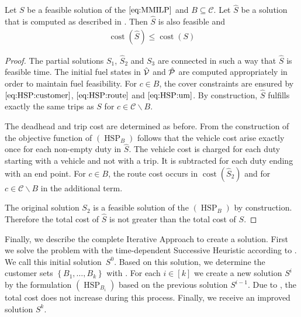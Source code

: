 \begin{lemma}
\label{lem:feasibility_hsp}

Let $S$ be a feasible solution of the $\eqref{eq:MMILP}$ and $B\subseteq\mathcal{C}$. Let $\widehat{S}$ be a solution that is computed as described in . Then $\widehat{S}$ is also feasible and
\begin{align*}
	\operatorname{cost}\left(\widehat{S}\right) \leq \operatorname{cost}\left(S\right)
\end{align*}

\end{lemma}

\begin{proof}

The partial solutions $S_1$, $\widehat{S}_2$ and $S_3$ are connected in such a way that $\widehat{S}$ is feasible \wrt time. The initial fuel states in $\hat{\mathcal{V}}$ and $\hat{\mathcal{P}}$ are computed appropriately in order to maintain fuel feasibility. For ${c\in B}$, the cover constraints are ensured by $\eqref{eq:HSP:customer}$, $\eqref{eq:HSP:route}$ and $\eqref{eq:HSP:um}$. By construction, $\widehat{S}$ fulfills exactly the same trips as $S$ for ${c\in\mathcal{C}\backslash B}$.

The deadhead and trip cost are determined as before. From the construction of the objective function of $(\operatorname{HSP}_B)$ follows that the vehicle cost arise exactly once for each non-empty duty in $\widehat{S}$. The vehicle cost is charged for each duty starting with a vehicle and not with a trip. It is subtracted for each duty ending with an end point. For ${c\in B}$, the route cost occurs in $\operatorname{cost}\left(\widehat{S}_2\right)$ and for ${c\in\mathcal{C}\backslash B}$ in the additional term.

The original solution $S_2$ is a feasible solution of the $(\operatorname{HSP}_B)$ by construction. Therefore the total cost of $\widehat{S}$ is not greater than the total cost of $S$.

\end{proof}

Finally, we describe the complete Iterative Approach to create a solution. First we solve the problem with the time-dependent Successive Heuristic according to . We call this initial solution~$S^0$. Based on this solution, we determine the customer sets $\left\{B_1,\dots,B_k\right\}$ with . For each ${i\in[k]}$ we create a new solution $S^i$ by the formulation $(\operatorname{HSP}_{B_i})$ based on the previous solution $S^{i-1}$. Due to , the total cost does not increase during this process. Finally, we receive an improved solution $S^k$.

